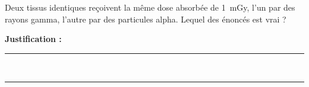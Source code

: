 Deux tissus identiques reçoivent la même dose absorbée de \qty{1}{mGy}, l'un par des rayons gamma, l'autre par des particules alpha. Lequel des énoncés est vrai ?

\choices

\noindent\textbf{Justification :} \hrulefill \\[2.5ex]
\rule{\linewidth}{0.4pt} \\[2.5ex]
\rule{\linewidth}{0.4pt}
\vfill
